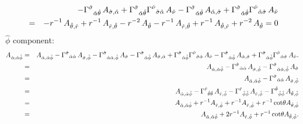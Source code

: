 \documentclass[\mydriver,12pt,twoside,notitlepage,a4paper]{article}
\begin{document}
\begin{eqnarray}
&&-{\Gamma^{\hat\sigma}}_{\hat\alpha\hat\theta}\,A_{\hat\sigma,\hat\alpha}
+{\Gamma^{\hat\sigma}}_{\hat\alpha\hat\theta}{\Gamma^{\hat\nu}}_{\hat\sigma\hat\alpha}\,A_{\hat\nu}
-{\Gamma^{\hat\sigma}}_{\hat\alpha\hat\theta}\,A_{\hat\alpha,\hat\sigma}
+{\Gamma^{\hat\sigma}}_{\hat\alpha\hat\theta}{\Gamma^{\hat\nu}}_{\hat\alpha\hat\sigma}\,A_{\hat\nu}
\cr
&=&
-r^{-1}\,A_{\hat\theta,\hat r}
+r^{-1}\,A_{\hat r,\hat\theta}
-r^{-2}\,A_{\hat\theta}
-r^{-1}\,A_{\hat r,\hat\theta}
+r^{-1}\,A_{\hat\theta,\hat r}
+r^{-2}\,A_{\hat\theta}
=0
\end{eqnarray}
$\hat\phi$ component:
\begin{eqnarray}
A_{\hat\alpha;\hat\alpha\hat\phi}
&=&A_{\hat\alpha,\hat\alpha\hat\phi}
-{\Gamma^{\hat\sigma}}_{\hat\alpha\hat\alpha}\,A_{\hat\sigma,\hat\phi}
-{\Gamma^{\hat\sigma}}_{\hat\alpha\hat\alpha,\hat\phi}\,A_{\hat\sigma}
-{\Gamma^{\hat\sigma}}_{\hat\alpha\hat\phi}\,A_{\hat\sigma,\hat\alpha}
+{\Gamma^{\hat\sigma}}_{\hat\alpha\hat\phi}{\Gamma^{\hat\nu}}_{\hat\sigma\hat\alpha}\,A_{\hat\nu}
-{\Gamma^{\hat\sigma}}_{\hat\alpha\hat\phi}\,A_{\hat\alpha,\hat\sigma}
+{\Gamma^{\hat\sigma}}_{\hat\alpha\hat\phi}{\Gamma^{\hat\nu}}_{\hat\alpha\hat\sigma}\,A_{\hat\nu}.
\cr
&=&A_{\hat\alpha,\hat\alpha\hat\phi}
-{\Gamma^{\hat\sigma}}_{\hat\alpha\hat\alpha}\,A_{\hat\sigma,\hat\phi}
-{\Gamma^{\hat\sigma}}_{\hat\alpha\hat\alpha,\hat\phi}\,A_{\hat\sigma}
\cr
&=&A_{\hat\alpha,\hat\alpha\hat\phi}
-{\Gamma^{\hat\sigma}}_{\hat\alpha\hat\alpha}\,A_{\hat\sigma,\hat\phi}
\cr
&=&A_{\hat\alpha,\hat\alpha\hat\phi}
-{\Gamma^{\hat r}}_{\hat\theta\hat\theta}\,A_{\hat r,\hat\phi}
-{\Gamma^{\hat r}}_{\hat\phi\hat\phi}\,A_{\hat r,\hat\phi}
-{\Gamma^{\hat\theta}}_{\hat\phi\hat\phi}\,A_{\hat\theta,\hat\phi}
\cr
&=&A_{\hat\alpha,\hat\alpha\hat\phi}
+r^{-1}A_{\hat r,\hat\phi}
+r^{-1}A_{\hat r,\hat\phi}
+r^{-1}\cot\!\theta A_{\hat\theta,\hat\phi}
\cr
&=&A_{\hat\alpha,\hat\alpha\hat\phi}
+2r^{-1}A_{\hat r,\hat\phi}
+r^{-1}\cot\!\theta A_{\hat\theta,\hat\phi}.
\end{eqnarray}
\end{document}
